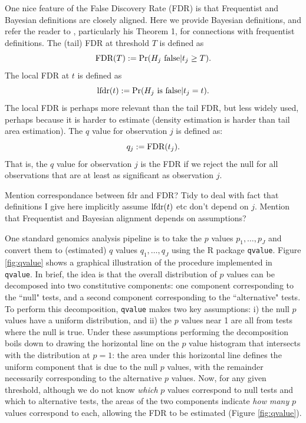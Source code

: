 \documentclass[11pt]{article}
\def\qvalue{{\tt qvalue}\xspace}
\begin{document}
One nice feature of the False Discovery Rate (FDR) is that Frequentist and Bayesian definitions are closely aligned.
Here we provide Bayesian definitions, and refer the reader to \cite{storey.03}, particularly his Theorem 1,  for connections with frequentist definitions.
The (tail) FDR at threshold $T$ is defined as
\begin{equation}
\text{FDR}(T) := \Pr(\text{$H_j$ false} | t_j \geq T).
\end{equation}
The local FDR at $t$ is defined \cite{efron2008microarrays} as
\begin{equation}
\text{lfdr}(t) := \Pr(\text{$H_j$ is false} | t_j = t).
\end{equation}
The local FDR is perhaps more relevant than the tail FDR, but less widely used, perhaps because
it is harder to estimate (density estimation is harder than tail area estimation). 
The $q$ value for observation $j$ is defined \cite{storey.03} as:
\begin{equation}
q_j := \text{FDR}(t_j).
\end{equation}
That is, the $q$ value for observation $j$ is the FDR if we reject the null for all observations that are at least as significant as observation $j$.

Mention correspondance between fdr and FDR?
Tidy to deal with fact that definitions I give here implicitly assume $\text{lfdr}(t)$ etc don't depend on $j$.
Mention that Frequentist and Bayesian alignment depends on assumptions?

One standard genomics analysis pipeline is to take the $p$ values $p_1,\dots,p_J$ and convert them to (estimated) $q$ values $q_1,\dots,q_J$
 using the R package \qvalue. Figure \ref{fig:qvalue} shows a graphical illustration of the procedure implemented in \qvalue. 
 In brief, the idea is that the overall distribution of $p$ values can be decomposed into two constitutive
 components: one component corresponding to the ``null" tests, and a second component corresponding to the ``alternative" tests. 
To perform this decomposition, \qvalue makes two key assumptions:
  i) the null $p$ values have a uniform distribution, and ii) the $p$ values near 1 are all from
 tests where the null is true. Under these assumptions performing the decomposition boils down to 
 drawing the horizontal line on the $p$ value histogram that intersects with the distribution at $p=1$: the area under this horizontal
 line defines the uniform component that is due to the null $p$ values, with the remainder necessarily corresponding to
 the alternative $p$ values. Now, for any given threshold, although we do not know {\it which} $p$ values correspond
 to  null tests  and which to alternative tests, the areas of the two components indicate {\it how many} $p$ values correspond to each,
 allowing the FDR to be estimated (Figure \ref{fig:qvalue}).
 
\end{document}
